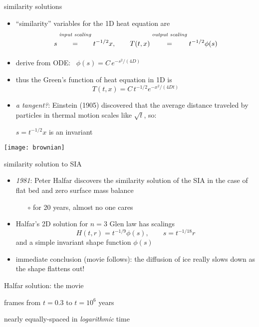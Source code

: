 \begin{frame}{similarity solutions}

\begin{itemize}
\item ``similarity'' variables for the 1D heat equation are
	$$s \stackrel{\text{\emph{input scaling}}}{\phantom{\Big|}=\phantom{\Big|}} t^{-1/2} x, \qquad T(t,x) \stackrel{\text{\emph{output scaling}}}{\phantom{\Big|}=\phantom{\Big|}} t^{-1/2} \phi(s)$$
\item derive from ODE: \, $\phi(s) = C\, e^{-s^2/(4D)}$
\item thus the Green's function of heat equation in 1D is
	$$T(t,x) = C\, t^{-1/2} e^{-x^2/(4Dt)}$$

\bigskip
\item \begin{minipage}[t]{0.55\textwidth}
\noindent \emph{a tangent?}: Einstein (1905) discovered that the average distance traveled by particles in thermal motion scales like $\sqrt{t}$, so:

\centerline{$s = t^{-1/2}x$ is an invariant}
\end{minipage}
\end{itemize}

\vspace{-20mm}
\hfill \texttt{[image: brownian]}
\end{frame}


\begin{frame}{similarity solution to SIA}

\begin{itemize}
\item \emph{1981}:  Peter Halfar discovers the similarity solution of the SIA in the case of flat bed and zero surface mass balance
  \begin{itemize}
  \item[$\circ$] for 20 years, almost no one cares
  \end{itemize}
\item Halfar's 2D solution for $n=3$ Glen law has scalings
   $$H(t,r)=t^{-1/9} \phi(s), \qquad s = t^{-1/18} r$$
and a simple invariant shape function $\phi(s)$

\medskip
\item immediate conclusion (\alert{movie follows}): the diffusion of ice really slows down as the shape flattens out!
\end{itemize}
\end{frame}


\begin{frame}{Halfar solution: the movie}
\label{slide:plothalfar}

\medskip
\small
frames from $t=0.3$ to $t = 10^6$ years

\medskip
nearly equally-spaced in \emph{logarithmic} time

\begin{center}
\end{center}
\end{frame}


